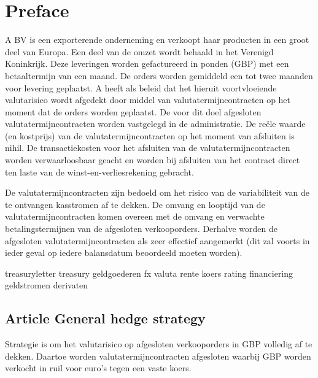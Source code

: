 

\setcounter{page}{2}

\section*{Preface}
A BV \citep{aoibsfc} is een exporterende onderneming en verkoopt haar producten in een groot deel van Europa. Een deel van de omzet wordt behaald in het Verenigd Koninkrijk. Deze leveringen worden gefactureerd in ponden (GBP) met een betaaltermijn van een maand. De orders worden gemiddeld een tot twee maanden voor levering geplaatst. A heeft als beleid dat het hieruit voortvloeiende valutarisico wordt afgedekt door middel van valutatermijncontracten op het moment dat de orders worden geplaatst. De voor dit doel afgesloten valutatermijncontracten worden vastgelegd in de administratie. De reële waarde (en kostprijs) van de valutatermijncontracten op het moment van afsluiten is nihil. De transactiekosten voor het afsluiten van de valutatermijncontracten worden verwaarloosbaar geacht en worden bij afsluiten van het contract direct ten laste van de winst-en-verliesrekening gebracht.

De valutatermijncontracten zijn bedoeld om het risico van de variabiliteit van de te ontvangen kasstromen af te dekken. De omvang en looptijd van de valutatermijncontracten komen overeen met de omvang en verwachte betalingstermijnen van de afgesloten verkooporders. Derhalve worden de afgesloten valutatermijncontracten als zeer effectief aangemerkt (dit zal voorts in ieder geval op iedere balansdatum beoordeeld moeten worden).


\printglossary[title=Glossary]
\gls{treasuryletter} \gls{treasury} \gls{geldgoederen} \gls{fx} \gls{valuta} \gls{rente} \gls{koers} \gls{rating} \gls{financiering} \gls{geldstromen} \gls{derivaten}



\subsection*{Article \theartikel \hspace{1em} General hedge strategy}
Strategie is om het valutarisico op afgesloten verkooporders in GBP volledig af te dekken. Daartoe worden valutatermijncontracten afgesloten waarbij GBP worden verkocht in ruil voor euro’s tegen een vaste koers.


